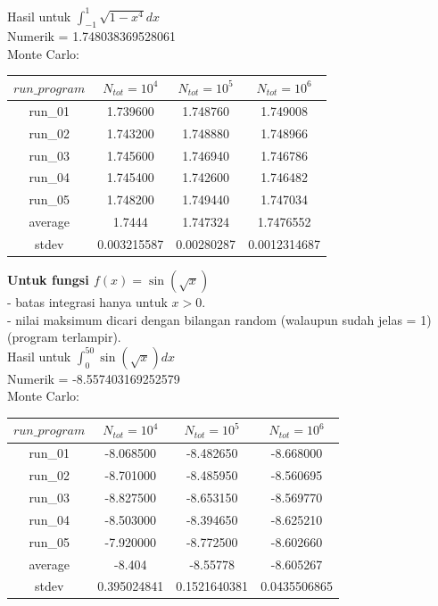 \documentclass[paper=a4, fontsize=11pt]{scrartcl}
\numberwithin{equation}{section} %
\numberwithin{figure}{section} %
\numberwithin{table}{section} %
\begin{document}
Hasil untuk $\int_{-1}^{1} \sqrt{1-x^{4}} dx$\\
Numerik = 1.748038369528061\\
Monte Carlo:
\begin{table}[ht]
\begin{tabular}{c c c c}
\hline
$run\_program$ & $N_{tot} = 10^{4}$ & $N_{tot} = 10^{5}$ & $N_{tot} = 10^{6}$  \\ [0.5ex]
\hline 
run\_01 & 1.739600 & 1.748760 & 1.749008 \\
run\_02 & 1.743200 & 1.748880 & 1.748966 \\
run\_03 & 1.745600 & 1.746940 & 1.746786\\
run\_04 & 1.745400 & 1.742600 & 1.746482\\
run\_05 & 1.748200 & 1.749440 & 1.747034\\ [0.5ex]
\hline 
average & 1.7444	 & 1.747324	& 1.7476552\\
\hline
stdev & 0.003215587	& 0.00280287	 & 0.0012314687\\
\hline
\end{tabular}
\end{table}

\textbf{Untuk fungsi $f(x) = \sin(\sqrt x)$}\\
- batas integrasi hanya untuk $x > 0$.\\
- nilai maksimum dicari dengan bilangan random (walaupun sudah jelas = 1) (program terlampir).\\

Hasil untuk $\int_{0}^{50} \sin(\sqrt x) dx$\\
Numerik = -8.557403169252579\\
Monte Carlo:
\begin{table}[ht]
\begin{tabular}{c c c c}
\hline
$run\_program$ & $N_{tot} = 10^{4}$ & $N_{tot} = 10^{5}$ & $N_{tot} = 10^{6}$  \\ [0.5ex]
\hline 
run\_01 & -8.068500 & -8.482650 & -8.668000 \\
run\_02 & -8.701000 & -8.485950 & -8.560695 \\
run\_03 & -8.827500 & -8.653150 & -8.569770\\
run\_04 & -8.503000 & -8.394650 & -8.625210\\
run\_05 & -7.920000 & -8.772500 & -8.602660\\ [0.5ex]
\hline 
average & -8.404	 & -8.55778	 & -8.605267\\
\hline
stdev & 0.395024841	& 0.1521640381	& 0.0435506865\\
\hline
\end{tabular}
\end{table}
\end{document}
